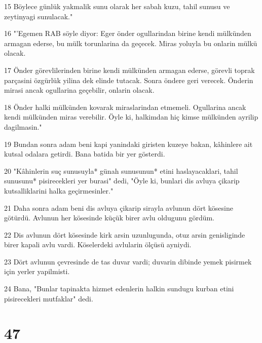 \par 15 Böylece günlük yakmalik sunu olarak her sabah kuzu, tahil sunusu ve zeytinyagi sunulacak."
\par 16 "'Egemen RAB söyle diyor: Eger önder ogullarindan birine kendi mülkünden armagan ederse, bu mülk torunlarina da geçecek. Miras yoluyla bu onlarin mülkü olacak.
\par 17 Önder görevlilerinden birine kendi mülkünden armagan ederse, görevli toprak parçasini özgürlük yilina dek elinde tutacak. Sonra öndere geri verecek. Önderin mirasi ancak ogullarina geçebilir, onlarin olacak.
\par 18 Önder halki mülkünden kovarak miraslarindan etmemeli. Ogullarina ancak kendi mülkünden miras verebilir. Öyle ki, halkimdan hiç kimse mülkünden ayrilip dagilmasin."
\par 19 Bundan sonra adam beni kapi yanindaki giristen kuzeye bakan, kâhinlere ait kutsal odalara getirdi. Bana batida bir yer gösterdi.
\par 20 "Kâhinlerin suç sunusuyla* günah sunusunun* etini haslayacaklari, tahil sunusunu* pisirecekleri yer burasi" dedi, "Öyle ki, bunlari dis avluya çikarip kutsalliklarini halka geçirmesinler."
\par 21 Daha sonra adam beni dis avluya çikarip sirayla avlunun dört kösesine götürdü. Avlunun her kösesinde küçük birer avlu oldugunu gördüm.
\par 22 Dis avlunun dört kösesinde kirk arsin uzunlugunda, otuz arsin genisliginde birer kapali avlu vardi. Köselerdeki avlularin ölçüsü ayniydi.
\par 23 Dört avlunun çevresinde de tas duvar vardi; duvarin dibinde yemek pisirmek için yerler yapilmisti.
\par 24 Bana, "Bunlar tapinakta hizmet edenlerin halkin sundugu kurban etini pisirecekleri mutfaklar" dedi.

\chapter{47}


